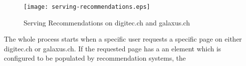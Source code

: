 \begin{figure}[H]
	\centering
	\captionsetup{width=0.8\textwidth}
    \texttt{[image: serving-recommendations.eps]}
    \caption{Serving Recommendations on digitec.ch and galaxus.ch}
    \label{fig:serving_recs}
\end{figure}

The whole process starts when a specific user requests a specific page on either digitec.ch or galaxus.ch.
If the requested page has a an element which is configured to be populated by recommendation systems, the 